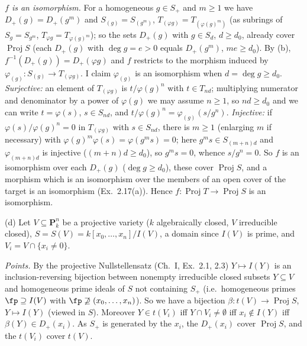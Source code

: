 \documentclass[11pt]{article}
\begin{document}
\emph{$f$ is an isomorphism.} For a homogeneous $g\in S_+$ and $m\ge1$ we have $D_+(g)=D_+(g^m)$ and $S_{(g)}=S_{(g^m)}$, $T_{(\varphi g)}=T_{(\varphi(g)^m)}$ (as subrings of $S_g=S_{g^m}$, $T_{\varphi g}=T_{\varphi(g)^m}$); so the sets $D_+(g)$ with $g\in S_d$, $d\ge d_0$, already cover $\operatorname{Proj}S$ (each $D_+(g)$ with $\deg g=e>0$ equals $D_+(g^m)$, $me\ge d_0$). By (b), $f^{-1}(D_+(g))=D_+(\varphi g)$ and $f$ restricts to the morphism induced by $\varphi_{(g)}:S_{(g)}\to T_{(\varphi g)}$. I claim $\varphi_{(g)}$ is an isomorphism when $d=\deg g\ge d_0$.
\emph{Surjective:} an element of $T_{(\varphi g)}$ is $t/\varphi(g)^n$ with $t\in T_{nd}$; multiplying numerator and denominator by a power of $\varphi(g)$ we may assume $n\ge1$, so $nd\ge d_0$ and we can write $t=\varphi(s)$, $s\in S_{nd}$, and $t/\varphi(g)^n=\varphi_{(g)}(s/g^n)$.
\emph{Injective:} if $\varphi(s)/\varphi(g)^n=0$ in $T_{(\varphi g)}$ with $s\in S_{nd}$, there is $m\ge1$ (enlarging $m$ if necessary) with $\varphi(g)^m\varphi(s)=\varphi(g^ms)=0$; here $g^ms\in S_{(m+n)d}$ and $\varphi_{(m+n)d}$ is injective ($(m+n)d\ge d_0$), so $g^ms=0$, whence $s/g^n=0$.
So $f$ is an isomorphism over each $D_+(g)$ ($\deg g\ge d_0$), these cover $\operatorname{Proj}S$, and a morphism which is an isomorphism over the members of an open cover of the target is an isomorphism (Ex.~2.17(a)). Hence $f:\operatorname{Proj}T\to\operatorname{Proj}S$ is an isomorphism.

(d) Let $V\subseteq\mathbf P^n_k$ be a projective variety ($k$ algebraically closed, $V$ irreducible closed), $S=S(V)=k[x_0,\dots,x_n]/I(V)$, a domain since $I(V)$ is prime, and $V_i=V\cap\{x_i\ne0\}$.

\emph{Points.} By the projective Nullstellensatz (Ch.~I, Ex.~2.1, 2.3) $Y\mapsto I(Y)$ is an inclusion-reversing bijection between nonempty irreducible closed subsets $Y\subseteq V$ and homogeneous prime ideals of $S$ not containing $S_+$ (i.e.\ homogeneous primes $\fp\supseteq I(V)$ with $\fp\not\supseteq(x_0,\dots,x_n)$). So we have a bijection $\beta:t(V)\to\operatorname{Proj}S$, $Y\mapsto I(Y)$ (viewed in $S$). Moreover $Y\in t(V_i)$ iff $Y\cap V_i\ne\emptyset$ iff $x_i\notin I(Y)$ iff $\beta(Y)\in D_+(x_i)$. As $S_+$ is generated by the $x_i$, the $D_+(x_i)$ cover $\operatorname{Proj}S$, and the $t(V_i)$ cover $t(V)$.
\end{document}
